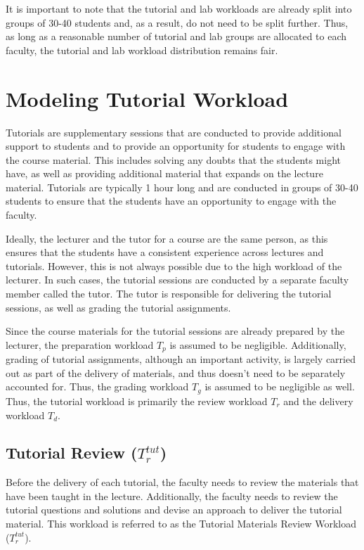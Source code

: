 It is important to note that the tutorial and lab workloads are already split into groups of 30-40 students and, as a result, do not need to be split further. Thus, as long as a reasonable number of tutorial and lab groups are allocated to each faculty, the tutorial and lab workload distribution remains fair.

\section{Modeling Tutorial Workload}

Tutorials are supplementary sessions that are conducted to provide additional support to students and to provide an opportunity for students to engage with the course material. This includes solving any doubts that the students might have, as well as providing additional material that expands on the lecture material. Tutorials are typically 1 hour long and are conducted in groups of 30-40 students to ensure that the students have an opportunity to engage with the faculty.

Ideally, the lecturer and the tutor for a course are the same person, as this ensures that the students have a consistent experience across lectures and tutorials. However, this is not always possible due to the high workload of the lecturer. In such cases, the tutorial sessions are conducted by a separate faculty member called the tutor. The tutor is responsible for delivering the tutorial sessions, as well as grading the tutorial assignments.

Since the course materials for the tutorial sessions are already prepared by the lecturer, the preparation workload \(T_p\) is assumed to be negligible. Additionally, grading of tutorial assignments, although an important activity, is largely carried out as part of the delivery of materials, and thus doesn't need to be separately accounted for. Thus, the grading workload \(T_g\) is assumed to be negligible as well. Thus, the tutorial workload is primarily the review workload \(T_r\) and the delivery workload \(T_d\).

\subsection{Tutorial Review (\texorpdfstring{\(T_r^{tut}\)}{})}

Before the delivery of each tutorial, the faculty needs to review the materials that have been taught in the lecture. Additionally, the faculty needs to review the tutorial questions and solutions and devise an approach to deliver the tutorial material. This workload is referred to as the Tutorial Materials Review Workload (\(T_r^{tut}\)).

